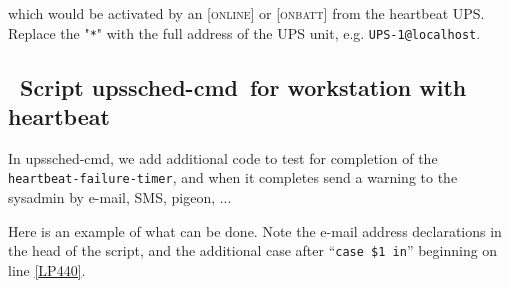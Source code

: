 \documentclass[12pt]{article}
\newlength{\headersep}\setlength{\headersep}{3mm}
\newcommand{\Hsep}{\hspace{\headersep}}
\newcommand{\upsschedcmd}{\mbox{\textcolor{CMDCOLOUR}{upssched-cmd}}}
\newcommand{\ONLINE}{\textcolor{MONCOLOUR}{\textsc{online}}}
\newcommand{\ONBATT}{\textcolor{MONCOLOUR}{\textsc{onbatt}}}
\newcommand{\NOTev}[1]{\textcolor{MONCOLOUR}{[{#1}]}}
\newcommand{\heartfailtimer}{\texttt{heartbeat{\allowbreak}-failure{\allowbreak}-timer}}
\begin{document}
\noindent which would be activated by an \NOTev{\ONLINE} or \NOTev{\ONBATT}
from the heartbeat UPS.  Replace the "\texttt{*}" with the full address of the
UPS unit, e.g. \verb`UPS-1@localhost`.

\subsection{\Hsep\ Script \upsschedcmd\ for workstation with heartbeat}\label{section:upsschedcmd.heartbeat}

In \upsschedcmd, we add additional code to test for completion of the
\heartfailtimer, and when it completes send a warning to the sysadmin by
e-mail, SMS, pigeon, ...

Here is an example of what can be done.  Note the e-mail address declarations
in the head of the script, and the additional case after ``\verb`case $1 in`''
beginning on line \ref{LP440}.
\end{document}
